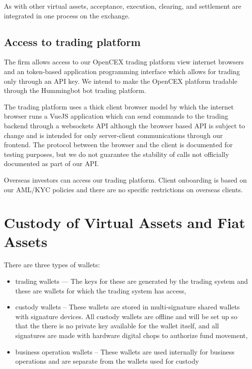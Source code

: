 As with other virtual assets, acceptance, execution, clearing, and
settlement are integrated in one process on the exchange.

\subsection{Access to trading platform}
The firm allows access to our OpenCEX trading platform view internet
browsers and an token-based application programming interface which
allows for trading only through an API key. We intend to make the
OpenCEX platform tradable through the Hummingbot bot trading platform.

The trading platform uses a thick client browser model by which the
internet browser runs a VueJS application which can send commands to
the trading backend through a websockets API although the browser
based API is subject to change and is intended for only server-client
communications through our frontend.  The protocol between the browser
and the client is documented for testing purposes, but we do not
guarantee the stability of calls not officially documented as part of
our API.

Overseas investors can access our trading platform.  Client onboarding
is based on our AML/KYC policies and there are no specific
restrictions on overseas clients.

\section{Custody of Virtual Assets and Fiat Assets}

There are three types of wallets:
\begin{itemize}
  \item trading wallets — The keys for these are generated by the
    trading system and these are wallets for which the trading system
    has access,
  \item custody wallets – These wallets are stored in multi-signature
    shared wallets with signature devices.  All custody wallets are
    offline and will be set up so that the there is no private key
    available for the wallet itself, and all signatures are made with
    hardware digital chops to authorize fund movement,
  \item business operation wallets – These wallets are used internally
    for business operations and are separate from the wallets used for
    custody
\end{itemize}

